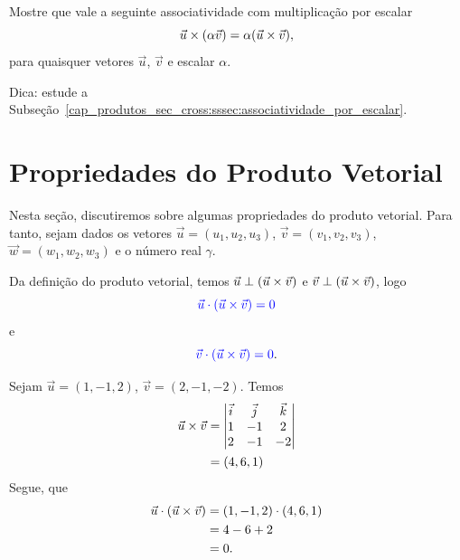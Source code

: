 \begin{exer}\label{cap_produtos_sec_cross:exer:associatividade_por_escalar}
  Mostre que vale a seguinte associatividade com multiplicação por escalar
  \begin{equation}
    \vec{u}\times(\alpha\vec{v}) = \alpha(\vec{u}\times\vec{v}),
  \end{equation}
  para quaisquer vetores $\vec{u}$, $\vec{v}$ e escalar $\alpha$.
\end{exer}
\begin{resp}
  Dica: estude a Subseção~\ref{cap_produtos_sec_cross:sssec:associatividade_por_escalar}.
\end{resp}


\section{Propriedades do Produto Vetorial}\label{cap_prodvet_sec_prop}
\badgeRevisar

Nesta seção, discutiremos sobre algumas propriedades do produto vetorial. Para tanto, sejam dados os vetores $\vec{u} = (u_1,u_2,u_3)$, $\vec{v}=(v_1,v_2,v_3)$, $\vec{w}=(w_1,w_2,w_3)$ e o número real $\gamma$.

Da definição do produto vetorial, temos $\vec{u}\perp(\vec{u}\times\vec{v})$ e $\vec{v}\perp(\vec{u}\times\vec{v})$, logo
\begin{equation}
  {\color{blue}\vec{u}\cdot(\vec{u}\times\vec{v}) = 0}
\end{equation}
e
\begin{equation}
  {\color{blue}\vec{v}\cdot(\vec{u}\times\vec{v}) = 0}.
\end{equation}

\begin{ex}
  Sejam $\vec{u}=(1,-1,2)$, $\vec{v}=(2,-1,-2)$. Temos
  \begin{align}
    \vec{u}\times\vec{v} &=
    \begin{vmatrix}
      \vec{i} & \vec{j} & \vec{k} \\
      1 & -1 & 2 \\
      2 & -1 & -2
    \end{vmatrix}\\
              &= (4,6,1)
  \end{align}
  Segue, que
  \begin{align}
    \vec{u}\cdot(\vec{u}\times\vec{v}) &= (1,-1,2)\cdot (4,6,1) \\
                                      &= 4-6+2\\
                                      &= 0.
  \end{align}
\end{ex}

